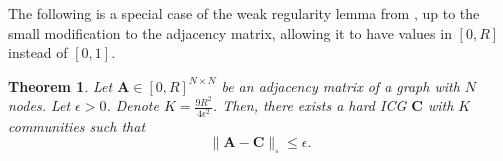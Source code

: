 \documentclass{article}
\theoremstyle{plain}
\newtheorem{theorem}{Theorem}[section]
\theoremstyle{definition}
\theoremstyle{remark}
\newcommand{\ron}[1]{{{\textcolor{red}{\textbf{[Ron:} {#1}\textbf{]}}}}}
\begin{document}



The following is a special case of the weak regularity lemma from \cite{Levie_intersecting_reg_24}, up to the small modification to the adjacency matrix, allowing it to have values in $[0,R]$ instead of $[0,1]$. %

\begin{theorem}
\label{thm:reg_sprase}
     Let $\mathbf{A}\in[0,R]^{N\times N}$ be an adjacency matrix of a graph with $N$ nodes. Let $\epsilon>0$. Denote $K=\frac{9R^2}{4\epsilon^2}$. Then, there exists a hard ICG $\mathbf{C}$ with $K$ communities such that 
    \begin{equation}
        \label{eq:reg_sparse}
    \|\mathbf{A}-\mathbf{C}\|_{\square} \leq \epsilon.
    \end{equation}
\end{theorem}
\end{document}
